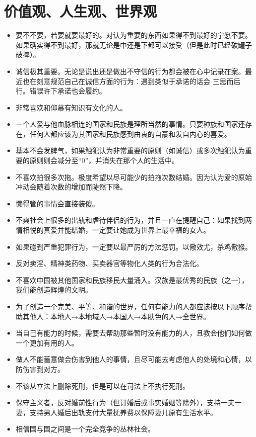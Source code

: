 \documentclass[UTF8]{ctexart}
\begin{document}
\section{价值观、人生观、世界观}
\begin{itemize}
\item 要不不要，若要就要最好的。对认为重要的东西如果得不到最好的宁愿不要。如果确实得不到最好，那就无论是中还是下都可以接受（但是此时已经破罐子破摔）。
\item 诚信极其重要。无论是说出还是做出不守信的行为都会被在心中记录在案。最近也在刻意规范自己在诚信方面的行为：遇到类似于承诺的话会
三思而后行。错误许下承诺也会履约。
\item 非常喜欢和仰慕有知识有文化的人。
\item 一个人爱与他血脉相连的国家和民族是理所当然的事情。只要种族和国家还存在，任何人都应该为其国家和民族感到由衷的自豪和发自内心的喜爱。
\item 基本不会发脾气，如果触犯认为非常重要的原则（如诚信）或多次触犯认为重要的原则则会减分至“0”，并消失在那个人的生活中。
\item 不喜欢拍很多次拖。极度希望以尽可能少的拍拖次数结婚。因为认为爱的原始冲动会随着次数的增加而陡然下降。
\item 懒得管的事情会直接装傻。
\item 不爽社会上很多的出轨和虐待伴侣的行为，并且一直在提醒自己：如果找到两情相悦的真爱并能结婚，一定要让她成为世界上最幸福的女人。
\item 如果碰到严重犯罪行为，一定要以最严厉的方法惩罚。以儆效尤，杀鸡儆猴。
\item 反对卖淫、精神类药物、买卖器官等物化人类的行为合法化。
\item 不喜欢中国被其他国家和民族移民大量涌入。汉族是最优秀的民族（之一），我们能创造辉煌的文明。
\item 为了创造一个完美、平等、和谐的世界，任何有能力的人都应该按以下顺序帮助其他人：本地人→本地域人→本国人→本肤色的人→全世界。
\item 当自己有能力的时候，需要去帮助那些暂时没有能力的人，且教会他们如何做一个更加有用的人。
\item 做人不能蓄意做会伤害到他人的事情，且尽可能去考虑他人的处境和心情，以防伤害到对方。
\item 不该从立法上删除死刑，但是可以在司法上不执行死刑。
\item 保守主义者，反对婚前性行为（但订婚后或事实婚姻等除外），支持一夫一妻，支持男人婚后出轨支付大量抚养费以保障妻儿原有生活水平。
\item 相信国与国之间是一个完全竞争的丛林社会。
\end{itemize}
\end{document}
